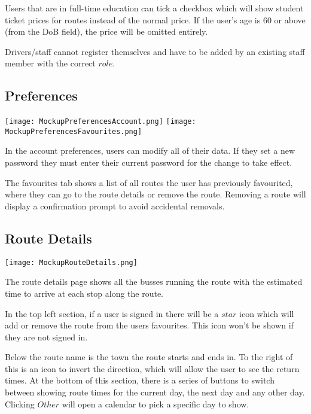 \medskip

Users that are in full-time education can tick a checkbox which will
show student ticket prices for routes instead of the normal price.
If the user's age is 60 or above (from the DoB field), the price
will be omitted entirely.

\medskip

Drivers/staff cannot register themselves and have to be added by an
existing staff member with the correct $role$.

\subsection{Preferences}

\texttt{[image: MockupPreferencesAccount.png]}
\texttt{[image: MockupPreferencesFavourites.png]}

\medskip

In the account preferences, users can modify all of their data. If
they set a new password they must enter their current password for
the change to take effect.

\medskip

The favourites tab shows a list of all routes the user has
previously favourited, where they can go to the route details or
remove the route. Removing a route will display a confirmation
prompt to avoid accidental removals.

\subsection{Route Details}

\texttt{[image: MockupRouteDetails.png]}

\medskip

The route details page shows all the busses running the route with
the estimated time to arrive at each stop along the route.

\medskip

In the top left section, if a user is signed in there will be a
$star$ icon which will add or remove the route from the users
favourites. This icon won't be shown if they are not signed in.

\medskip

Below the route name is the town the route starts and ends in. To
the right of this is an icon to invert the direction, which will
allow the user to see the return times. At the bottom of this
section, there is a series of buttons to switch between showing
route times for the current day, the next day and any other day.
Clicking $Other$ will open a calendar to pick a specific day to
show.

